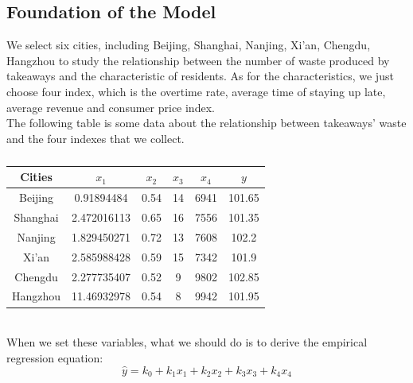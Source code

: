 \documentclass[UTF8]{article}
\begin{document}
\subsection{Foundation of the Model}
\indent We select six cities, including Beijing, Shanghai, Nanjing, Xi’an, Chengdu, Hangzhou to study the relationship between the number of waste produced by takeaways and the characteristic of residents. As for the characteristics, we just choose four index, which is the overtime rate, average time of staying up late, average revenue and consumer price index.\\
\indent The following table is some data about the relationship between takeaways’ waste and the four indexes that we collect.\\
\begin{table}[h]
\caption{}
\begin{center}
\begin{tabular}{cccccc}
\hline
Cities&\(x_1\)&\(x_2\)&\(x_3\)&\(x_4\)&\(y\)\\
\hline
Beijing&0.91894484&0.54&14&6941&101.65\\
\hline
Shanghai&2.472016113&0.65&16&7556&101.35\\
\hline
Nanjing&1.829450271&0.72&13&7608&102.2\\
\hline
Xi'an&2.585988428&0.59&15&7342&101.9\\
\hline
Chengdu&2.277735407&0.52&9&9802&102.85\\
\hline
Hangzhou&11.46932978&0.54&8&9942&101.95\\
\hline
\end{tabular}
\end{center}
\end{table}\\
\indent When we set these variables, what we should do is to derive the empirical regression equation:
\[\hat{y}=k_0+k_1x_1+k_2x_2+k_3x_3+k_4x_4\]
\end{document}
